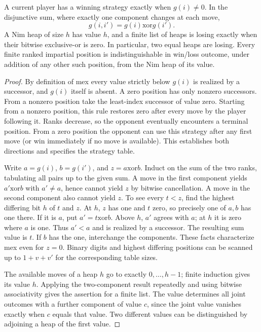 \begin{theorem}\label{result66}
A current player has a winning strategy exactly when $g(i)\ne0$.
In the disjunctive sum, where exactly one component changes at each move,
\[
 g(i,i')=g(i)\mathbin{\mathrm{xor}}g(i').
\]
A Nim heap of size $h$ has value $h$, and a finite list of heaps is
losing exactly when their bitwise exclusive-or is zero. In particular,
two equal heaps are losing. Every finite ranked impartial position is
indistinguishable in win/loss outcome, under addition of any other such
position, from the Nim heap of its value.
\end{theorem}
\begin{proof}
By definition of mex every value strictly below $g(i)$ is realized by
a successor, and $g(i)$ itself is absent. A zero position has only
nonzero successors. From a nonzero position take the least-index successor
of value zero. Starting from a nonzero position, this rule restores zero
after every move by the player following it. Ranks decrease, so the
opponent eventually encounters a terminal position. From a zero position
the opponent can use this strategy after any first move (or win immediately
if no move is available). This establishes both directions and specifies
the strategy table.

Write $a=g(i)$, $b=g(i')$, and $z=a\mathbin{\mathrm{xor}}b$. Induct on
the sum of the two ranks, tabulating all pairs up to the given sum.
A move in the first component yields $a'\mathbin{\mathrm{xor}}b$ with
$a'\ne a$, hence cannot yield $z$ by bitwise cancellation. A move in the
second component also cannot yield $z$. To see every $t<z$, find the
highest differing bit $h$ of $t$ and $z$. At $h$, $z$ has one and $t$
zero, so precisely one of $a,b$ has one there. If it is $a$, put
$a'=t\mathbin{\mathrm{xor}}b$. Above $h$, $a'$ agrees with $a$; at $h$
it is zero where $a$ is one. Thus $a'<a$ and is realized by a successor.
The resulting sum value is $t$. If $b$ has the one, interchange the
components. These facts characterize mex even for $z=0$. Binary digits and
highest differing positions can be scanned up to $1+v+v'$ for the
corresponding table sizes.

The available moves of a heap $h$ go to exactly $0,\ldots,h-1$; finite
induction gives its value $h$. Applying the two-component result repeatedly
and using bitwise associativity gives the assertion for a finite list.
The value determines all joint outcomes with a further component of value
$c$, since the joint value vanishes exactly when $c$ equals that value.
Two different values can be distinguished by adjoining a heap of the
first value.
\end{proof}
